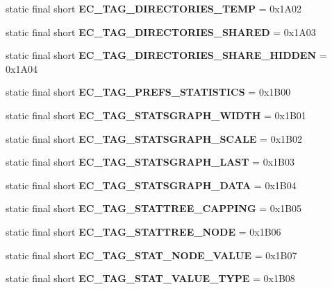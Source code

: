 \begin{DoxyCompactItemize}
\item 
static final short {\bfseries EC\_\-TAG\_\-DIRECTORIES\_\-TEMP} = 0x1A02\label{interfaceECCodes_a0b95f271d123ff3af0bb7292042134c5}

\item 
static final short {\bfseries EC\_\-TAG\_\-DIRECTORIES\_\-SHARED} = 0x1A03\label{interfaceECCodes_a4147d2adfc176f3f8bf611c8f012c489}

\item 
static final short {\bfseries EC\_\-TAG\_\-DIRECTORIES\_\-SHARE\_\-HIDDEN} = 0x1A04\label{interfaceECCodes_a41377bf4545f44899462c5c34866084a}

\item 
static final short {\bfseries EC\_\-TAG\_\-PREFS\_\-STATISTICS} = 0x1B00\label{interfaceECCodes_a78166050fa1c1cbdce8b301e3d6b8b58}

\item 
static final short {\bfseries EC\_\-TAG\_\-STATSGRAPH\_\-WIDTH} = 0x1B01\label{interfaceECCodes_a22b0a9139019a5243dfca1b7c58e568e}

\item 
static final short {\bfseries EC\_\-TAG\_\-STATSGRAPH\_\-SCALE} = 0x1B02\label{interfaceECCodes_aab56ece7e94cfd663638155b9f2196c7}

\item 
static final short {\bfseries EC\_\-TAG\_\-STATSGRAPH\_\-LAST} = 0x1B03\label{interfaceECCodes_a7801ec93205189415c0361c11ea702c9}

\item 
static final short {\bfseries EC\_\-TAG\_\-STATSGRAPH\_\-DATA} = 0x1B04\label{interfaceECCodes_a85803b97c88d4178042fa78a2ddd40fd}

\item 
static final short {\bfseries EC\_\-TAG\_\-STATTREE\_\-CAPPING} = 0x1B05\label{interfaceECCodes_aacdf820039c40060d523aa96dfcf024a}

\item 
static final short {\bfseries EC\_\-TAG\_\-STATTREE\_\-NODE} = 0x1B06\label{interfaceECCodes_aa891aab914be015baaff76ae7f79f964}

\item 
static final short {\bfseries EC\_\-TAG\_\-STAT\_\-NODE\_\-VALUE} = 0x1B07\label{interfaceECCodes_a93ebe4124310e574ba920aaf93cded80}

\item 
static final short {\bfseries EC\_\-TAG\_\-STAT\_\-VALUE\_\-TYPE} = 0x1B08\label{interfaceECCodes_a2f10143556d32d2b38a8ef178d9059d6}


\end{DoxyCompactItemize}
